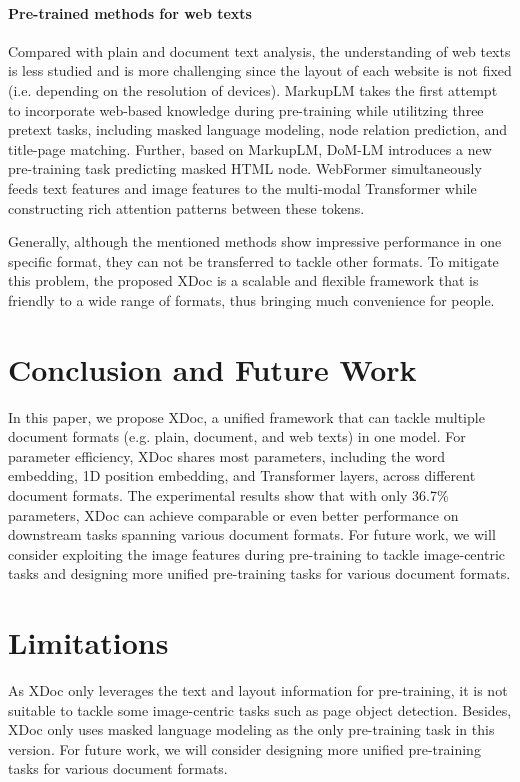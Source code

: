 \documentclass[11pt]{article}
\begin{document}
\paragraph{Pre-trained methods for web texts}
Compared with plain and document text analysis, the understanding of web texts is less studied and is more challenging since the layout of each website is not fixed (i.e. depending on the resolution of devices). MarkupLM \cite{li2021markuplm} takes the first attempt to incorporate web-based knowledge during pre-training while utilitzing three pretext tasks, including masked language modeling, node relation prediction, and title-page matching. Further, based on MarkupLM, DoM-LM \cite{deng2022dom} introduces a new pre-training task predicting masked HTML node. WebFormer \cite{wang2022webformer} simultaneously feeds text features and image features to the multi-modal Transformer while constructing rich attention patterns between these tokens.

Generally, although the mentioned methods show impressive performance in one specific format, they can not be transferred to tackle other formats. To mitigate this problem, the proposed XDoc is a scalable and flexible framework that is friendly to a wide range of formats, thus bringing much convenience for people.

\section{Conclusion and Future Work}
In this paper, we propose XDoc, a unified framework that can tackle multiple document formats (e.g. plain, document, and web texts) in one model. For parameter efficiency, XDoc shares most parameters, including the word embedding, 1D position embedding, and Transformer layers, across different document formats. The experimental results show that with only 36.7\% parameters, XDoc can achieve comparable or even better performance on downstream tasks spanning various document formats. For future work, we will consider exploiting the image features during pre-training to tackle image-centric tasks and designing more unified pre-training tasks for various document formats.

\section*{Limitations}
As XDoc only leverages the text and layout information for pre-training, it is not suitable to tackle some image-centric tasks such as page object detection. Besides, XDoc only uses masked language modeling as the only pre-training task in this version. For future work, we will consider designing more unified pre-training tasks for various document formats.
\end{document}
